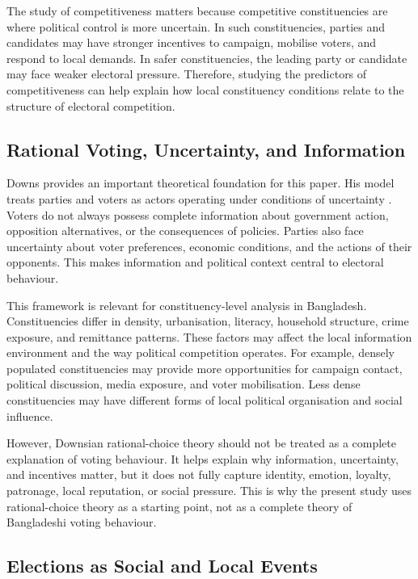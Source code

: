 \documentclass[12pt,a4paper]{article}
\begin{document}
The study of competitiveness matters because competitive constituencies are where political control is more uncertain. In such constituencies, parties and candidates may have stronger incentives to campaign, mobilise voters, and respond to local demands. In safer constituencies, the leading party or candidate may face weaker electoral pressure. Therefore, studying the predictors of competitiveness can help explain how local constituency conditions relate to the structure of electoral competition.

\subsection{Rational Voting, Uncertainty, and Information}

Downs provides an important theoretical foundation for this paper. His model treats parties and voters as actors operating under conditions of uncertainty \citep{downs1957}. Voters do not always possess complete information about government action, opposition alternatives, or the consequences of policies. Parties also face uncertainty about voter preferences, economic conditions, and the actions of their opponents. This makes information and political context central to electoral behaviour.

This framework is relevant for constituency-level analysis in Bangladesh. Constituencies differ in density, urbanisation, literacy, household structure, crime exposure, and remittance patterns. These factors may affect the local information environment and the way political competition operates. For example, densely populated constituencies may provide more opportunities for campaign contact, political discussion, media exposure, and voter mobilisation. Less dense constituencies may have different forms of local political organisation and social influence.

However, Downsian rational-choice theory should not be treated as a complete explanation of voting behaviour. It helps explain why information, uncertainty, and incentives matter, but it does not fully capture identity, emotion, loyalty, patronage, local reputation, or social pressure. This is why the present study uses rational-choice theory as a starting point, not as a complete theory of Bangladeshi voting behaviour.

\subsection{Elections as Social and Local Events}
\end{document}
